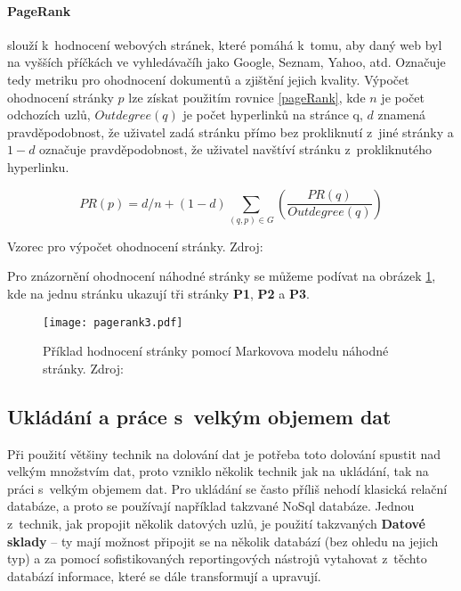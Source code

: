 \paragraph{PageRank} slouží k~hodnocení webových stránek, které pomáhá k~tomu, aby daný web byl na vyšších příčkách ve vyhledávačíh jako Google, Seznam, Yahoo, atd. Označuje tedy metriku pro ohodnocení dokumentů a zjištění jejich kvality. Výpočet ohodnocení stránky \(p\) lze získat použitím rovnice \ref{pageRank}, kde \(n\) je počet odchozích uzlů, \(Outdegree(q)\) je počet hyperlinků na stránce q, \(d\) znamená pravděpodobnost, že uživatel zadá stránku přímo bez prokliknutí z~jiné stránky a \(1 - d\) označuje pravděpodobnost, že uživatel navštíví stránku z~prokliknutého hyperlinku. \cite{minigbook}
\begin{equationcap}
\begin{equation} \label{pageRank}
PR(p) = d/n + (1-d) \sum_{(q,p) \in G}(\frac{PR(q)}{Outdegree(q)})
\end{equation}
\caption[Vzorec pro výpočet ohodnocení stránky]{Vzorec pro výpočet ohodnocení stránky. Zdroj: \cite{data-mining-principles}}
\end{equationcap}

\par Pro znázornění ohodnocení náhodné stránky se můžeme podívat na obrázek \ref{pageRankFig}, kde na jednu stránku ukazují tři stránky \textbf{P1}, \textbf{P2} a \textbf{P3}.
\begin{figure}[htp]
\centering
\texttt{[image: pagerank3.pdf]}
\caption[Příklad hodnocení stránky pomocí Markovova modelu náhodné stránky]{Příklad hodnocení stránky pomocí Markovova modelu náhodné stránky. Zdroj: \cite{minigbook}}
\label{pageRankFig}
\end{figure}

\subsection{Ukládání a práce s~velkým objemem dat}
\par Při použití většiny technik na dolování dat je potřeba toto dolování spustit nad velkým množstvím dat, proto vzniklo několik technik jak na ukládání, tak na práci s~velkým objemem dat. Pro ukládání se často příliš nehodí klasická relační databáze, a proto se používají například takzvané NoSql databáze. Jednou z~technik, jak propojit několik datových uzlů, je použití takzvaných \textbf{Datové sklady} -- ty mají možnost připojit se na několik databází (bez ohledu na jejich typ) a za pomocí sofistikovaných reportingových nástrojů vytahovat z~těchto databází informace, které se dále transformují a upravují. \cite{nosql}

